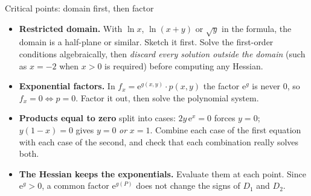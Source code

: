 \begin{rulebox}{Critical points: domain first, then factor}
\begin{itemize}[leftmargin=1.6em,itemsep=0.3ex]
  \item \textbf{Restricted domain.} With $\ln x$, $\ln(x+y)$ or $\sqrt{y}$ in
        the formula, the domain is a half-plane or similar. Sketch it
        first. Solve the first-order conditions algebraically, then
        \emph{discard every solution outside the domain} (such as $x=-2$
        when $x>0$ is required) before computing any Hessian.
  \item \textbf{Exponential factors.} In
        $f_{x}=\mathrm{e}^{g(x,y)}\cdot p(x,y)$ the factor
        $\mathrm{e}^{g}$ is never $0$, so $f_{x}=0\iff p=0$. Factor it out,
        then solve the polynomial system.
  \item \textbf{Products equal to zero} split into cases: $2y\,\mathrm{e}^{x}=0$
        forces $y=0$; $y(1-x)=0$ gives $y=0$ \emph{or} $x=1$. Combine each
        case of the first equation with each case of the second, and check
        that each combination really solves both.
  \item \textbf{The Hessian keeps the exponentials.} Evaluate them at each
        point. Since $\mathrm{e}^{g}>0$, a common factor $\mathrm{e}^{g(P)}$
        does not change the signs of $D_{1}$ and $D_{2}$.
\end{itemize}
\end{rulebox}

